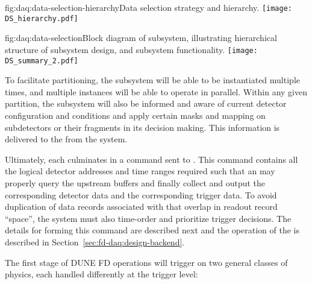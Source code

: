 \begin{dunefigure}{fig:daq:data-selection-hierarchy}{Data selection
    strategy and hierarchy.}
  \texttt{[image: DS\_hierarchy.pdf]}
\end{dunefigure}

\begin{dunefigure}{fig:daq:data-selection}{Block diagram of  
     subsystem, illustrating hierarchical structure of
    subsystem design, and subsystem functionality.}
  \texttt{[image: DS\_summary\_2.pdf]}
\end{dunefigure}

To facilitate partitioning, the  subsystem will be
able to be instantiated multiple times, and multiple instances will be
able to operate in parallel. Within any
given partition, the  subsystem will also be
informed and aware of current detector configuration and conditions and
apply certain masks and mapping on subdetectors or their fragments in
its decision making. This information is delivered to the
 from the  system.

Ultimately, each  culminates in a command sent to . 
This command contains all the logical detector addresses and time ranges
required such that an  may properly query the upstream 
buffers and finally collect and output the corresponding detector data
and the corresponding trigger data. To avoid duplication of data
records associated with  that overlap in readout
record ``space'', the  system must also time-order and
prioritize trigger decisions. The details for forming this
command are described next and the operation of the  is
described in Section~\ref{sec:fd-daq:design-backend}.

The first stage of DUNE FD operations will trigger on two general
classes of physics, each handled differently at the trigger level:

